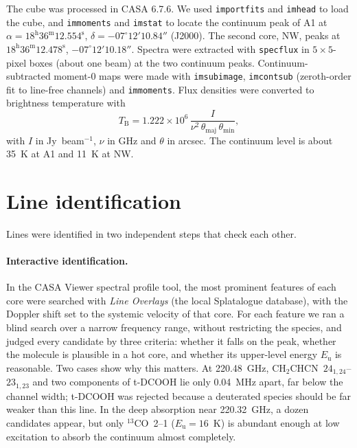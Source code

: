 \documentclass{aa}
\newcommand{\vycn}{CH$_2$CHCN}
\newcommand{\tco}{$^{13}$CO}
\begin{document}
The cube was processed in CASA 6.7.6. We used \texttt{importfits} and \texttt{imhead} to load the cube, and \texttt{immoments} and \texttt{imstat} to locate the continuum peak of A1 at $\alpha=18^\mathrm{h}36^\mathrm{m}12.554^\mathrm{s}$, $\delta=-07^\circ12'10.84''$ (J2000). The second core, NW, peaks at $18^\mathrm{h}36^\mathrm{m}12.478^\mathrm{s}$, $-07^\circ12'10.18''$. Spectra were extracted with \texttt{specflux} in $5\times5$-pixel boxes (about one beam) at the two continuum peaks. Continuum-subtracted moment-0 maps were made with \texttt{imsubimage}, \texttt{imcontsub} (zeroth-order fit to line-free channels) and \texttt{immoments}. Flux densities were converted to brightness temperature with
\begin{equation}
T_\mathrm{B} = 1.222\times10^{6}\,\frac{I}{\nu^2\,\theta_\mathrm{maj}\,\theta_\mathrm{min}},
\end{equation}
with $I$ in Jy~beam$^{-1}$, $\nu$ in GHz and $\theta$ in arcsec. The continuum level is about 35~K at A1 and 11~K at NW.

\section{Line identification}

Lines were identified in two independent steps that check each other.

\paragraph{Interactive identification.} In the CASA Viewer spectral profile tool, the most prominent features of each core were searched with \textit{Line Overlays} (the local Splatalogue database), with the Doppler shift set to the systemic velocity of that core. For each feature we ran a blind search over a narrow frequency range, without restricting the species, and judged every candidate by three criteria: whether it falls on the peak, whether the molecule is plausible in a hot core, and whether its upper-level energy $E_\mathrm{u}$ is reasonable. Two cases show why this matters. At 220.48~GHz, \vycn\ $24_{1,24}$--$23_{1,23}$ and two components of t-DCOOH lie only 0.04~MHz apart, far below the channel width; t-DCOOH was rejected because a deuterated species should be far weaker than this line. In the deep absorption near 220.32~GHz, a dozen candidates appear, but only \tco\ 2--1 ($E_\mathrm{u}=16$~K) is abundant enough at low excitation to absorb the continuum almost completely.
\end{document}
